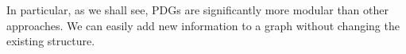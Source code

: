 \documentclass{article}
\newcommand{\MN}{PDG}
\numberwithin{equation}{section}
\begin{document}
\begin{notfocus}
In particular, as we shall see, \MN s are significantly more modular
than other approaches.
We can easily add new information to a graph
without changing the existing structure. 
%
%

\end{notfocus}
\end{document}
